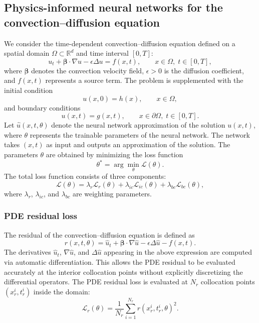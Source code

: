 \documentclass[10pt,reqno]{article}
\numberwithin{equation}{section}
\begin{document}
\subsection{Physics-informed neural networks for the convection--diffusion equation}
We consider the time-dependent convection--diffusion equation defined on a spatial domain $\Omega \subset \mathbb{R}^d$ and time interval $[0,T]$:
\begin{equation}
u_t + \boldsymbol{\beta}\cdot\nabla u - \epsilon \Delta u = f(x,t),
\qquad x \in \Omega, \; t \in [0,T],
\label{eq:cd}
\end{equation}
where $\boldsymbol{\beta}$ denotes the convection velocity field, $\epsilon>0$ is the diffusion coefficient, and $f(x,t)$ represents a source term.
The problem is supplemented with the initial condition
\begin{equation}
u(x,0) = h(x), \qquad x \in \Omega,
\label{eq:ic}
\end{equation}
and boundary conditions
\begin{equation}
u(x,t) = g(x,t), \qquad x \in \partial\Omega, \; t \in [0,T].
\label{eq:bc}
\end{equation}
Let $\hat{u}(x,t,\theta)$ denote the neural network approximation of the solution $u(x,t)$, where $\theta$ represents the trainable parameters of the neural network. The network takes $(x,t)$ as input and outputs an approximation of the solution.
The parameters $\theta$ are obtained by minimizing the loss function
\begin{equation}
\theta^{*} = \arg\min_{\theta} \mathcal{L}(\theta).
\label{eq:min}
\end{equation}
The total loss function consists of three components:
\begin{equation}
\mathcal{L}(\theta) =
\lambda_r \mathcal{L}_r(\theta)
+
\lambda_{ic} \mathcal{L}_{ic}(\theta)
+
\lambda_{bc} \mathcal{L}_{bc}(\theta),
\label{eq:loss}
\end{equation}
where $\lambda_r$, $\lambda_{ic}$, and $\lambda_{bc}$ are weighting parameters.
\subsubsection*{PDE residual loss}
The residual of the convection--diffusion equation is defined as
\begin{equation}
r(x,t,\theta) =
\hat{u}_t
+
\boldsymbol{\beta}\cdot\nabla \hat{u}
-
\epsilon \Delta \hat{u}
-
f(x,t).
\end{equation}
The derivatives $\hat{u}_t$, $\nabla \hat{u}$, and $\Delta \hat{u}$ appearing in the above expression are computed via automatic differentiation. This allows the PDE residual to be evaluated accurately at the interior collocation points without explicitly discretizing the differential operators.
The PDE residual loss is evaluated at $N_r$ collocation points $(x_r^i,t_r^i)$ inside the domain:
\begin{equation}
\mathcal{L}_r(\theta)
=
\frac{1}{N_r}
\sum_{i=1}^{N_r}
r(x_r^i,t_r^i,\theta)^2.
\label{eq:residual}
\end{equation}
\end{document}
